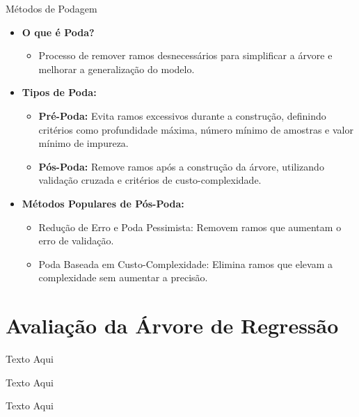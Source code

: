\documentclass[handout,aspectratio = 169]{beamer}
\begin{document}
\begin{frame}{Métodos de Podagem}
\begin{itemize}
    \item \textbf{O que é Poda?}
    \begin{itemize}
        \item Processo de remover ramos desnecessários para simplificar a árvore e melhorar a generalização do modelo.
    \end{itemize}

    \item \textbf{Tipos de Poda:}
    \begin{itemize}
        \item \textbf{Pré-Poda:} Evita ramos excessivos durante a construção, definindo critérios como profundidade máxima, número mínimo de amostras e valor mínimo de impureza.
        \item \textbf{Pós-Poda:} Remove ramos após a construção da árvore, utilizando validação cruzada e critérios de custo-complexidade.
    \end{itemize}

    \item \textbf{Métodos Populares de Pós-Poda:}
    \begin{itemize}
        \item Redução de Erro e Poda Pessimista: Removem ramos que aumentam o erro de validação.
        \item Poda Baseada em Custo-Complexidade: Elimina ramos que elevam a complexidade sem aumentar a precisão.
    \end{itemize}
\end{itemize}
\end{frame}


\section{Avaliação da Árvore de Regressão}

\begin{frame}{Texto Aqui}
\end{frame}

\begin{frame}{Texto Aqui}
\end{frame}

\begin{frame}{Texto Aqui}
\end{frame}
\end{document}
